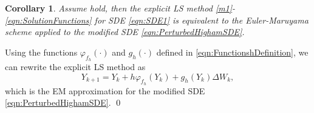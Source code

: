 \documentclass[sort&compress, preprint]{elsarticle}
\theoremstyle{definition}
\theoremstyle{plain}%
\newtheorem{corollary}{Corollary}[section]
\theoremstyle{remark}
\newcommand{\SM}{LS\xspace}
\begin{document}
\begin{corollary}\label{col:SSSMeEMmod}
	Assume  hold, then the 
	explicit \SM method \eqref{m1}-\eqref{eqn:SolutionFunctions} for SDE \eqref{eqn:SDE1} is 
	equivalent to the Euler-Maruyama scheme applied to the modified SDE \eqref{eqn:PerturbedHighamSDE}.
\end{corollary}
\begin{pf}
	Using the functions $\varphi_{f_h}(\cdot)$ and $g_h(\cdot)$ defined in \eqref{eqn:FunctionshDefinition}, 
	we can rewrite the explicit \SM method  as 
	$$
		Y_{k+1} = Y_k + h \varphi_{f_h}(Y_k) + g_h(Y_k)\Delta W_k,
	$$
	which is the EM approximation for the modified SDE \eqref{eqn:PerturbedHighamSDE}. \qed
\end{pf}
\end{document}
